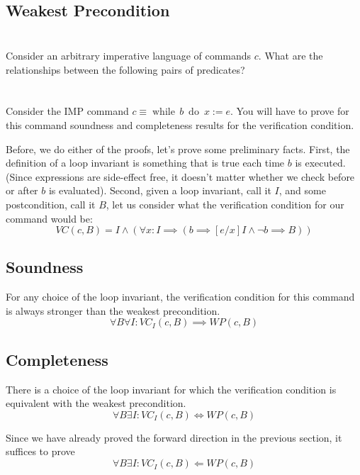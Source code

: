 \documentclass{article}
\newcommand{\problem}[1]
{\subsubsection*{} %
\vspace{-16pt} \section{} \vspace{-22pt} \qquad
#1%
\bigskip \bigskip
}
\newcommand{\while}[2]{\operatorname{while}\, #1\ \operatorname{do}\ #2}
\begin{document}
\subsection{Weakest Precondition}

\problem{Consider an arbitrary imperative language of commands $c$. What are
the relationships between the following pairs of predicates?}

\problem{Consider the IMP command $c \equiv \while{b}{x := e}$.
You will have to prove for this command soundness and completeness results for
the verification condition.
}

Before, we do either of the proofs, let's prove some preliminary facts.
First, the definition of a loop invariant is something that is true
each time $b$ is executed. (Since expressions are side-effect free, it doesn't
matter whether we check before or after $b$ is evaluated).
Second, given a loop invariant, call it $I$, and some postcondition, call it $B$,
let us consider what the verification condition for our command would be:
\[
VC(c, B) = I \wedge \left( \forall x : I \implies (b \implies [e/x]I \wedge \neg b \implies B) \right)
\]

\subsection{Soundness}
For any choice of the loop invariant, the verification condition for this
command is always stronger than the weakest precondition.
\[
\forall B \forall I : VC_I(c, B) \implies WP(c, B)
\]

\subsection{Completeness}
There is a choice of the loop invariant for which the verification condition is
equivalent with the weakest precondition.
\[
\forall B \exists I : VC_I(c, B) \Leftrightarrow WP(c, B)
\]

Since we have already proved the forward direction in the previous section, it suffices to prove
\[
\forall B \exists I : VC_I(c, B) \Leftarrow WP(c, B)
\]
\end{document}

